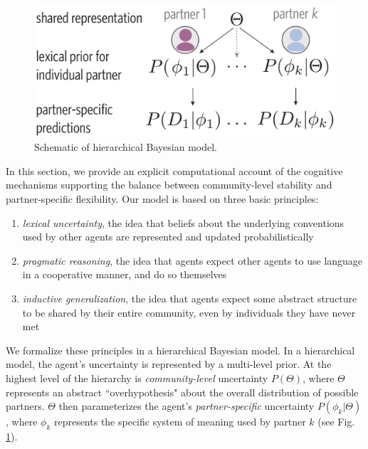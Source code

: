 
\begin{figure}[t!]
\includegraphics[scale=0.4]{./figures/task1_model.pdf}
\caption{Schematic of hierarchical Bayesian model.}
\label{fig:model_schematic}
\end{figure}


In this section, we provide an explicit computational account of the cognitive mechanisms supporting the balance between community-level stability and partner-specific flexibility.
Our model is based on three basic principles: 

\begin{enumerate}
\item \emph{lexical uncertainty}, the idea that beliefs about the underlying conventions used by other agents are represented and updated probabilistically \cite{bergen_pragmatic_2016}
\item \emph{pragmatic reasoning}, the idea that agents expect other agents to use language in a cooperative manner, and do so themselves  \cite{GoodmanFrank16_RSATiCS}
\item \emph{inductive generalization}, the idea that agents expect some abstract structure to be shared by their entire community, even by individuals they have never met \cite{}
\end{enumerate}

We formalize these principles in a hierarchical Bayesian model.
In a hierarchical model, the agent's uncertainty is represented by a multi-level prior. 
At the highest level of the hierarchy is \emph{community-level} uncertainty $P(\Theta)$, where $\Theta$ represents an abstract ``overhypothesis" about the overall distribution of possible partners. 
$\Theta$ then parameterizes the agent's \emph{partner-specific} uncertainty $P(\phi_{k} | \Theta)$, where $\phi_k$ represents the specific system of meaning used by partner $k$ (see Fig. \ref{fig:model_schematic}). 

